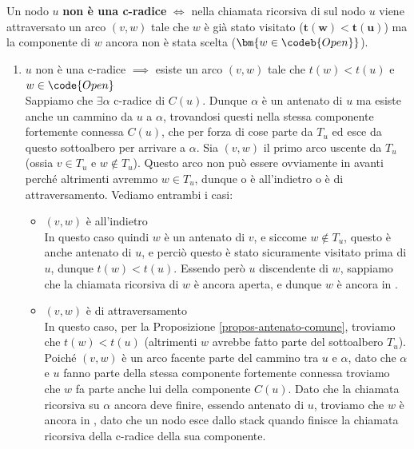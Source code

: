 \documentclass[11pt, a4paper, titlepage, oneside]{scrbook}
\begin{document}
\begin{Proposizione}[]
\label{propos-nodo-c-radice}
Un nodo $u$ \textbf{non è una c-radice} $\iff$ nella chiamata ricorsiva di  sul nodo $u$ viene attraversato un arco $(v,w)$ tale che $w$ è già stato visitato ($\bm{t(w) < t(u)}$) ma la componente di $w$ ancora non è stata scelta ($\bm{w \in \codeb{Open}}$).
\end{Proposizione}

\Dimostrazione \nopagebreak

\begin{enumerate}[label=\arabic*°]
    \item $u$ non è una c-radice $\implies$ esiste un arco $(v,w)$ tale che $t(w) < t(u)$ e $w \in \code{Open}$ \\
    Sappiamo che $\exists \alpha$ c-radice di $C(u)$. Dunque $\alpha$ è un antenato di $u$ ma esiste anche un cammino da $u$ a $\alpha$, trovandosi questi nella stessa componente fortemente connessa $C(u)$, che per forza di cose parte da $T_u$ ed esce da questo sottoalbero per arrivare a $\alpha$. Sia $(v,w)$ il primo arco uscente da $T_u$ (ossia $v \in T_u$ e $w \notin T_u$). Questo arco non può essere ovviamente in avanti perché altrimenti avremmo $w \in T_u$, dunque o è all'indietro o è di attraversamento. Vediamo entrambi i casi:
    \begin{itemize}
        \item $(v,w)$ è all'indietro \\
        In questo caso quindi $w$ è un antenato di $v$, e siccome $w \notin T_u$, questo è anche antenato di $u$, e perciò questo è stato sicuramente visitato prima di $u$, dunque $t(w) < t(u)$. Essendo però $u$ discendente di $w$, sappiamo che la chiamata ricorsiva di $w$ è ancora aperta, e dunque $w$ è ancora in .
        \item $(v,w)$ è di attraversamento \\
        In questo caso, per la Proposizione \ref{propos-antenato-comune}, troviamo che $t(w) < t(u)$ (altrimenti $w$ avrebbe fatto parte del sottoalbero $T_u$). Poiché $(v,w)$ è un arco facente parte del cammino tra $u$ e $\alpha$, dato che $\alpha$ e $u$ fanno parte della stessa componente fortemente connessa troviamo che $w$ fa parte anche lui della componente $C(u)$. Dato che la chiamata ricorsiva su $\alpha$ ancora deve finire, essendo antenato di $u$, troviamo che $w$ è ancora in , dato che un nodo esce dallo stack quando finisce la chiamata ricorsiva della c-radice della sua componente.
    \end{itemize}

\end{enumerate}
\end{document}
